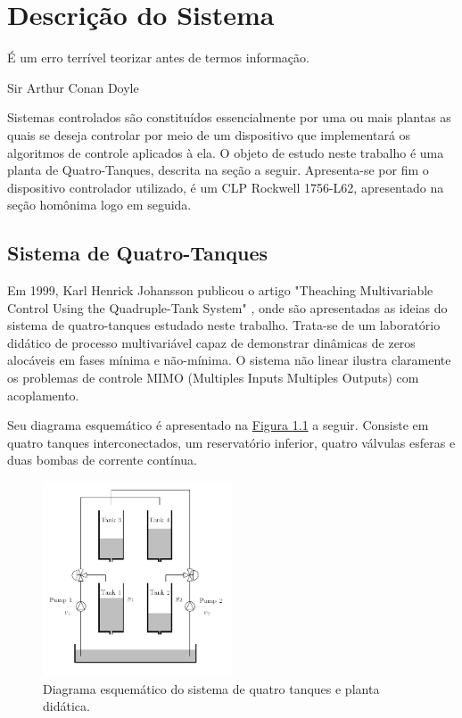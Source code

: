 %

\chapter{Descrição do Sistema} \label{capDescSis}
\epigraph{É um erro terrível teorizar antes de termos informação.}{Sir Arthur Conan Doyle}

Sistemas controlados são constituídos essencialmente por uma ou mais plantas as quais se deseja controlar por meio de  um dispositivo que implementará os algoritmos de controle aplicados à ela. O objeto de estudo neste trabalho é uma planta de Quatro-Tanques, descrita na seção a seguir. Apresenta-se por fim o dispositivo controlador utilizado, é um CLP Rockwell 1756-L62, apresentado na seção homônima logo em seguida.

\section{Sistema de Quatro-Tanques}
Em 1999, Karl Henrick Johansson publicou o artigo "Theaching Multivariable Control Using the Quadruple-Tank System" \cite{johansson2}, onde são apresentadas as ideias do sistema de quatro-tanques estudado neste trabalho. Trata-se de um laboratório didático de processo multivariável capaz de demonstrar dinâmicas de zeros alocáveis em fases mínima e não-mínima. O sistema não linear ilustra claramente os problemas de controle MIMO (Multiples Inputs Multiples Outputs) com acoplamento.

Seu diagrama esquemático é apresentado na  \hyperref[figDesc4tank]{Figura \ref{figDesc4tank}} a seguir. Consiste em quatro tanques interconectados, um reservatório inferior, quatro válvulas esferas e duas bombas de corrente contínua.

\begin{figure}[H]
	\centering
	\includegraphics[width=0.5\textwidth]{img/4tank.png}
	\caption{\label{figDesc4tank}Diagrama esquemático do sistema de quatro tanques e planta didática.}
\end{figure}

